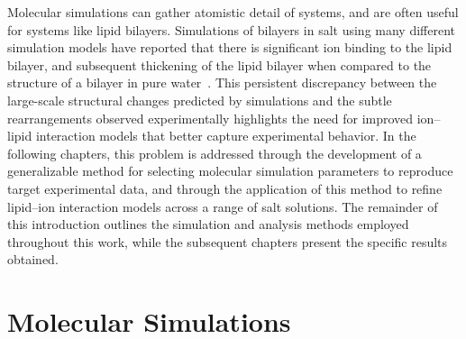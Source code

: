 Molecular simulations can gather atomistic detail of systems, and are often useful for systems like lipid bilayers. Simulations of bilayers
in salt using many different simulation models 
have reported that there is significant ion binding to the lipid bilayer, and subsequent 
thickening of the lipid bilayer when compared to the structure 
of a bilayer in pure 
water~\cite{Bockmann:2003,cordomi:2008,gurtovenko:2008,Cordomi:2009,jurkiewicz:2012,pandit:2008:simulationtextbook,kruczek:2017,kruczek:2019,saunders:2019}.
This persistent discrepancy between the large-scale structural changes predicted by 
simulations and the subtle rearrangements observed experimentally highlights the need for improved 
ion–lipid interaction models that better capture experimental behavior. 
In the following chapters, this problem is addressed through the development of a generalizable 
method for selecting molecular simulation parameters to reproduce target experimental data, and through 
the application of this method to refine lipid–ion interaction models across a range of salt solutions. 
The remainder of this introduction outlines the simulation and analysis methods employed throughout this work, 
while the subsequent chapters present the specific results obtained.


\section{Molecular Simulations}
